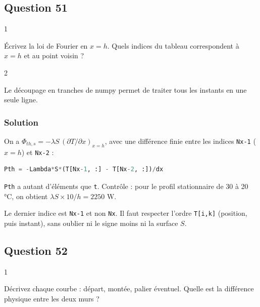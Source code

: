 \documentclass[11pt,a4paper]{article}
\begin{document}
\hypertarget{question-51}{%
\subsection{Question 51}\label{question-51}}

\begin{indication}{1}

Écrivez la loi de Fourier en \(x = h\). Quels indices du tableau correspondent à \(x = h\) et au point voisin ?

\end{indication}

\begin{indication}{2}

Le découpage en tranches de numpy permet de traiter tous les instants en une seule ligne.

\end{indication}

\hypertarget{solution-50}{%
\subsubsection{Solution}\label{solution-50}}

On a \(\Phi_{th,s} = -\lambda S\,(\partial T/\partial x)_{x=h}\), avec une différence finie entre les indices \texttt{Nx-1} (\(x = h\)) et \texttt{Nx-2} :

\begin{lstlisting}[language=Python]
Pth = -Lambda*S*(T[Nx-1, :] - T[Nx-2, :])/dx
\end{lstlisting}

\texttt{Pth} a autant d'éléments que \texttt{t}. Contrôle : pour le profil stationnaire de 30 à 20 °C, on obtient \(\lambda S\times10/h = 2250\) W.

\begin{piege}

Le dernier indice est \texttt{Nx-1} et non \texttt{Nx}. Il faut respecter l'ordre \texttt{T{[}i,k{]}} (position, puis instant), sans oublier ni le signe moins ni la surface \(S\).

\end{piege}

\hypertarget{question-52}{%
\subsection{Question 52}\label{question-52}}

\begin{indication}{1}

Décrivez chaque courbe : départ, montée, palier éventuel. Quelle est la différence physique entre les deux murs ?

\end{indication}
\end{document}
